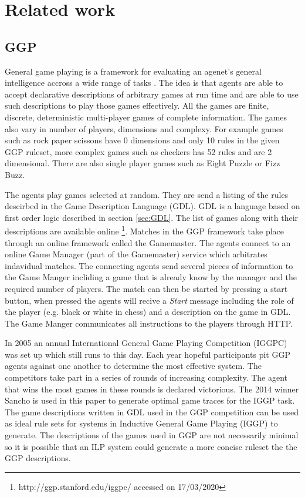 \chapter{Related work}

\section{GGP}

General game playing is a framework for evaluating an agenet's general intelligence accross a wide range of tasks \cite{Cropper/IGGP}. The idea is that agents are able to accept declarative descriptions of arbitrary games at run time and are able to use such descriptions to play those games effectively. All the games are finite, discrete, deterministic multi-player games of complete information. The games also vary in number of players, dimensions and complexy. For example games such as rock paper scissons have 0 dimensions and only 10 rules in the given GGP ruleset, more complex games such as checkers has 52 rules and are 2 dimensional. There are also single player games such as Eight Puzzle or Fizz Buzz.

The agents play games selected at random. They are send a listing of the rules descirbed in the Game Description Language (GDL). GDL is a language based on first order logic described in section \ref{sec:GDL}. The list of games along with their descriptions are available online \footnote{http://ggp.stanford.edu/iggpc/ accessed on 17/03/2020}. Matches in the GGP framework take place through an online framework called the Gamemaster. The agents connect to an online Game Manager (part of the Gamemaster) service which arbitrates indavidual matches. The connecting agents send several pieces of information to the Game Manger incliding a game that is already know by the manager and the required number of players. The match can then be started by pressing a start button, when pressed the agents will recive a \textit{Start} message including the role of the player (e.g. black or white in chess) and a description on the game in GDL. The Game Manger communicates all instructions to the players through HTTP\cite{Genesereth/GGPOverview}.

In 2005 an annual International General Game Playing Competition (IGGPC) was set up which still runs to this day\cite{Kowalski/GGP}. Each year hopeful participants pit GGP agents against one another to determine the most effective system. The competitors take part in a series of rounds of increasing complexity. The agent that wins the most games in these rounds is declared victorious. The 2014 winner Sancho is used in this paper to generate optimal game traces for the IGGP task. The game descriptions written in GDL used in the GGP competition can be used as ideal rule sets for systems in Inductive General Game Playing (IGGP) to generate. The descriptions of the games used in GGP are not necessarily minimal so it is possible that an ILP system could generate a more concise ruleset the the GGP descriptions.

